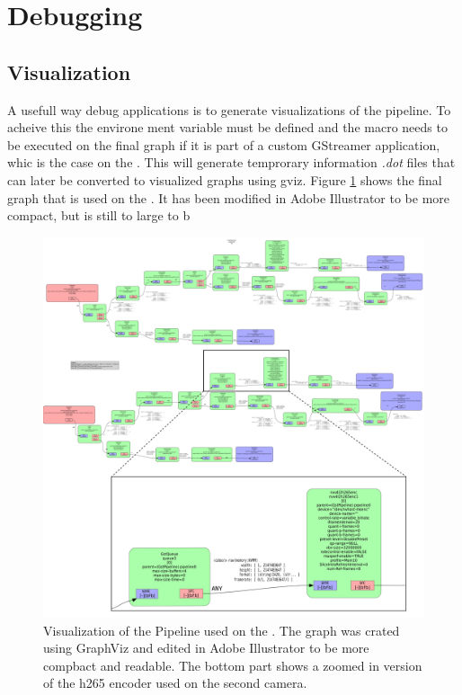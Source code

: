 \section{Debugging}

\subsection{Visualization}
A usefull way debug \gs applications is to generate visualizations of the pipeline.
To acheive this the environe ment variable  must be defined and the  macro needs to be executed on the final graph if it is part of a custom GStreamer application, whic is the case on the \sr.
\cite{johnstonGeneratingGStreamerPipeline2018}
This will generate temprorary information \textit{.dot} files that can later be converted to visualized graphs using \gls{gviz}.
Figure \ref{fig:gs_pipeline_visualization} shows the final graph that is used on the \sr.
It has been modified in Adobe Illustrator to be more compact, but is still to large to b


\begin{figure}[H]
    \centering
    \includegraphics[width=\textwidth]{figures/pipeline.pdf}
    \caption{Visualization of the \gs Pipeline used on the \sr.
        The graph was crated using GraphViz and edited in Adobe Illustrator to be more compbact and readable. The bottom part shows a zoomed in version of the \gls{h265} encoder used on the second camera.}
    \label{fig:gs_pipeline_visualization}
\end{figure}

